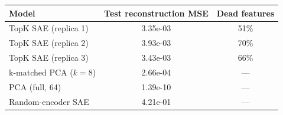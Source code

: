 \begin{tabular}{lcc}
\toprule
Model & Test reconstruction MSE & Dead features \\
\midrule
TopK SAE (replica 1) & 3.35e-03 & 51\% \\
TopK SAE (replica 2) & 3.93e-03 & 70\% \\
TopK SAE (replica 3) & 3.43e-03 & 66\% \\
k-matched PCA ($k=8$) & 2.66e-04 & --- \\
PCA (full, 64) & 1.39e-10 & --- \\
Random-encoder SAE & 4.21e-01 & --- \\
\bottomrule
\end{tabular}
